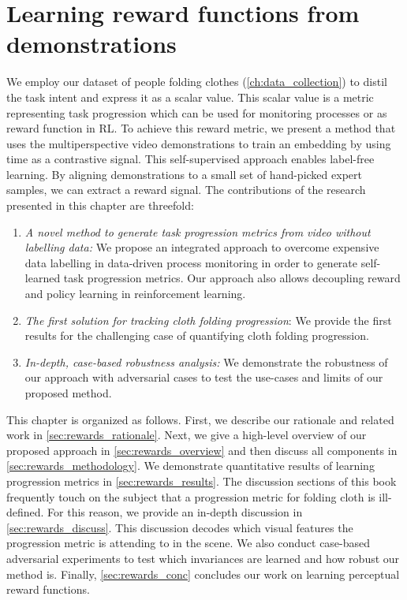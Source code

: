 \documentclass[\home/main.tex]{subfiles}
\begin{document}


\chapter{Learning reward functions from demonstrations}\label{ch:reward_functions}

We employ our dataset of people folding clothes (\cref{ch:data_collection}) to distil the task intent and express it as a scalar value. This scalar value is a metric representing task progression which can be used for monitoring processes or as reward function in \gls{RL}. To achieve this reward metric, we present a method that uses the multiperspective video demonstrations to train an embedding by using time as a contrastive signal. This self-supervised approach enables label-free learning. By aligning demonstrations to a small set of hand-picked expert samples, we can extract a reward signal. The contributions of the research presented in this chapter are threefold:
\begin{enumerate}
    \item \emph{A novel method to generate task progression metrics from video without labelling data:} We propose an integrated approach to overcome expensive data labelling in data-driven process monitoring in order to generate self-learned task progression metrics. Our approach also allows decoupling reward and policy learning in reinforcement learning.
    \item \emph{The first solution for tracking cloth folding progression}: We provide the first results for the challenging case of quantifying cloth folding progression.
    \item \emph{In-depth, case-based robustness analysis:} We demonstrate the robustness of our approach with adversarial cases to test the use-cases and limits of our proposed method.
\end{enumerate}

This chapter is organized as follows.
First, we describe our rationale and related work in \cref{sec:rewards_rationale}. Next, we give a high-level overview of our proposed approach in \cref{sec:rewards_overview} and then discuss all components in \cref{sec:rewards_methodology}. We demonstrate quantitative results of learning progression metrics in \cref{sec:rewards_results}. The discussion sections of this book frequently touch on the subject that a progression metric for folding cloth is ill-defined. For this reason, we provide an in-depth discussion in \cref{sec:rewards_discuss}. This discussion decodes which visual features the progression metric is attending to in the scene. We also conduct case-based adversarial experiments to test which invariances are learned and how robust our method is. Finally, \cref{sec:rewards_conc} concludes our work on learning perceptual reward functions.
\end{document}
